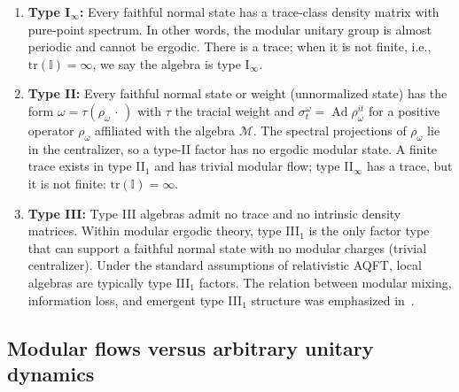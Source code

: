 \documentclass[a4paper,11pt]{article}
\theoremstyle{definition}
\newcommand{\mM}{\mathcal{M}}
\newcommand{\tr}{\text{tr}}
\begin{document}
\begin{enumerate}
    \item {\bf Type I$_\infty$:} Every faithful normal state has a trace-class density matrix with pure-point spectrum. In other words, the modular unitary group is almost periodic and cannot be ergodic. There is a trace; when it is not finite, i.e., $\tr(\mathbb{I})=\infty$, we say the algebra is type I$_\infty$.

    \item {\bf Type II:} Every faithful normal state or weight (unnormalized state) has the form $\omega=\tau(\rho_\omega\,\cdot\,)$ with $\tau$ the tracial weight and $\sigma_t^\omega=\operatorname{Ad}\rho_\omega^{it}$ for a positive operator $\rho_\omega$ affiliated with the algebra $\mM$. The spectral projections of $\rho_\omega$ lie in the centralizer, so a type-II factor has no ergodic modular state. A finite trace exists in type II$_1$ and has trivial modular flow; type II$_\infty$ has a trace, but it is not finite: $\tr(\mathbb{I})=\infty$.
    
    \item {\bf Type III:} Type III algebras admit no trace and no intrinsic density matrices. Within modular ergodic theory, type III$_1$ is the only factor type that can support a faithful normal state with no modular charges (trivial centralizer). Under the standard assumptions of relativistic AQFT, local algebras are typically type III$_1$ factors. The relation between modular mixing, information loss, and emergent type III$_1$ structure was emphasized in~\cite{furuya2023information}.

\end{enumerate}


\subsection{Modular flows versus arbitrary unitary dynamics}\label{sec:modular-vs-dynamics}
\end{document}
